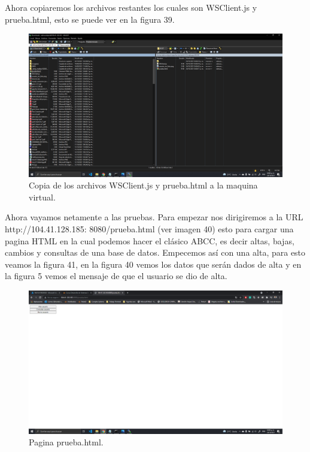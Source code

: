 \documentclass[11pt]{article}
\begin{document}
		 Ahora copiaremos los archivos restantes los cuales son WSClient.js y prueba.html, esto se puede ver en la figura 39.
		 \begin{figure}[H]
			\centering
			\includegraphics[scale=0.34]{resources/ULTIMO2y3.png}
			\caption{Copia de los archivos WSClient.js y prueba.html a la maquina virtual.}\label{fig:picture}
		\end{figure}
		Ahora vayamos netamente a las pruebas. Para empezar nos dirigiremos a la URL http://104.41.128.185:
8080/prueba.html (ver imagen 40) esto para cargar una pagina HTML en la cual podemos hacer el clásico ABCC, es decir altas, bajas, cambios y consultas de una base de datos. Empecemos así con una alta, para esto veamos la figura 41, en la figura 40 vemos los datos que serán dados de alta y en la figura 5 vemos el mensaje de que el usuario se dio de alta.
		\begin{figure}[H]
			\centering
			\includegraphics[scale=0.34]{resources/ULTIMO4.png}
			\caption{Pagina prueba.html.}\label{fig:picture}
		\end{figure}
\end{document}
